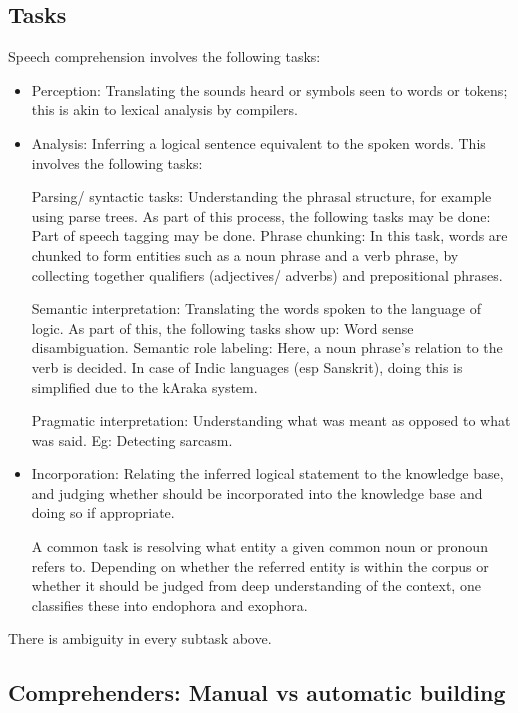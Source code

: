 \documentclass[oneside, article]{memoir}
\begin{document}
\subsection{Tasks}
Speech comprehension involves the following tasks:
\begin{itemize}
 \item Perception: Translating the sounds heard or symbols seen to words or tokens; this is akin to lexical analysis by compilers.  
 
\item Analysis: Inferring a logical sentence equivalent to the spoken words. This involves the following tasks:

  \subitem Parsing/ syntactic tasks: Understanding the phrasal structure, for example using parse trees. As part of this process, the following tasks may be done:
  \subsubitem Part of speech tagging may be done.
  \subsubitem Phrase chunking: In this task, words are chunked to form entities such as a noun phrase and a verb phrase, by collecting together qualifiers (adjectives/ adverbs) and prepositional phrases.

  \subitem Semantic interpretation: Translating the words spoken to the language of logic. As part of this, the following tasks show up:
  \subsubitem Word sense disambiguation.
  \subsubitem Semantic role labeling: Here, a noun phrase's relation to the verb is decided. In case of Indic languages (esp Sanskrit), doing this is simplified due to the kAraka system.

  \subitem Pragmatic interpretation: Understanding what was meant as opposed to what was said. Eg: Detecting sarcasm.

 \item Incorporation: Relating the inferred logical statement to the knowledge base, and judging whether should be incorporated into the knowledge base and doing so if appropriate.

  \subitem A common task is resolving what entity a given common noun or pronoun refers to. Depending on whether the referred entity is within the corpus or whether it should be judged from deep understanding of the context, one classifies these into endophora and exophora.

\end{itemize}

There is ambiguity in every subtask above.

\subsection{Comprehenders: Manual vs automatic building}
\end{document}
